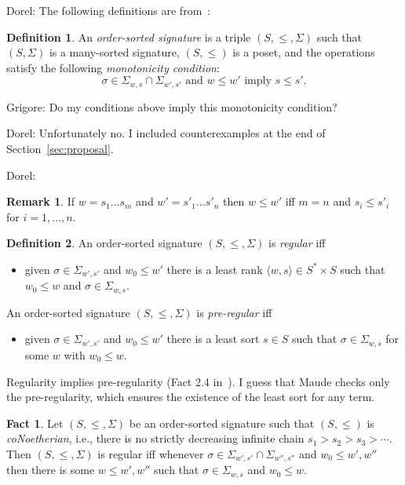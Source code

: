\documentclass{article}
\newcommand\comment[2]{\par\noindent\color{red}#1: #2\color{black}\par\noindent}
\newcommand\dl{\comment{Dorel}}
\newcommand\gr{\comment{Grigore}}
\theoremstyle{definition}
\theoremstyle{definition}
\theoremstyle{definition}
\newtheorem{definition}{Definition}[section]
\theoremstyle{definition}
\newtheorem{remark}{Remark}[section]
\theoremstyle{definition}
\theoremstyle{theorem}
\theoremstyle{theorem}
\newtheorem{fact}{Fact}[section]
\theoremstyle{theorem}
\theoremstyle{theorem}
\theoremstyle{theorem}
\begin{document}
\dl{
The following definitions are from~\cite{osa}:\\
\begin{definition}
An \emph{order-sorted signature} is a triple $(S,\le,\Sigma)$ such that $(S,\Sigma)$ is a many-sorted signature, $(S, \le)$ is a poset, and the operations satisfy the following \emph{monotonicity condition}:
\[
\sigma\in\Sigma_{w,s}\cap\Sigma_{w',s'}\textrm{~and~}w\le w'\textrm{~imply~}s\le s'.
\]
\end{definition}
}
\gr{Do my conditions above imply this monotonicity condition?}
\dl{Unfortunately no. I included counterexamples at the end of Section~\ref{sec:proposal}.}
\dl{
\begin{remark}
If $w=s_1\ldots s_m$ and $w'=s'_1\ldots s'_n$ then $w\le w'$ iff $m = n$ and $s_i\le s'_i$ for $i=1,\ldots,n$.
\end{remark}

\begin{definition}
An order-sorted signature $(S,\le,\Sigma)$ is \emph{regular} iff
\begin{itemize}
\item given $\sigma\in\Sigma_{w',s'}$ and $w_0\le w'$ there is a least rank $\langle w,s\rangle\in S^*\times S$ such that $w_0\le w$ and $\sigma\in\Sigma_{w,s}$.
\end{itemize}
An order-sorted signature $(S,\le,\Sigma)$ is \emph{pre-regular} iff
\begin{itemize}
\item given $\sigma\in\Sigma_{w',s'}$ and $w_0\le w'$ there is a least sort $s\in S$ such that  $\sigma\in\Sigma_{w,s}$ for some $w$ with $w_0\le w$.
\end{itemize}

\end{definition}

Regularity implies pre-regularity (Fact 2.4 in~\cite{osa}). I guess that Maude checks only the pre-regularity, which ensures the existence of the least sort for any term. 

\begin{fact}\cite{osa}\label{fact:reg}
Let  $(S,\le,\Sigma)$ be an order-sorted signature such that $(S,\le)$ is \emph{coNoetherian}, i.e., there is no strictly decreasing infinite chain $s_1>s_2>s_3>\cdots$.
Then $(S,\le,\Sigma)$ is regular iff whenever $\sigma\in \Sigma_{w',s'}\cap\Sigma_{w'',s''}$ and $w_0\le w',w''$ then there is some $w\le w',w''$ such that $\sigma\in\Sigma_{w,s}$ and $w_0\le w$.
\end{fact}

}
\end{document}
